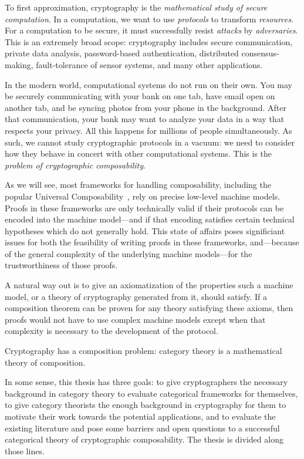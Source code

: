 

To first approximation, cryptography is the \emph{mathematical study of secure
computation}. In a computation, we want to use \emph{protocols} to transform
\emph{resources}. For a computation to be secure, it must successfully resist
\emph{attacks} by \emph{adversaries}. This is an extremely broad scope:
cryptography includes secure communication, private data analysis,
password-based authentication, distributed consensus-making, fault-tolerance of
sensor systems, and many other applications.

In the modern world, computational systems do not run on their own. You may be
securely communicating with your bank on one tab, have email open on another
tab, and be syncing photos from your phone in the background. After that
communication, your bank may want to analyze your data in a way that respects
your privacy. All this happens for millions of people simultaneously. As such,
we cannot study cryptographic protocols in a vacuum: we need to consider how
they behave in concert with other computational systems. This is the
\emph{problem of cryptographic composability}.

As we will see, most frameworks for handling composability, including the
popular Universal Composability~\cite{canetti-2000}, rely on precise low-level
machine models. Proofs in these frameworks are only technically valid if their
protocols can be encoded into the machine model---and if that encoding satisfies
certain technical hypotheses which do not generally hold. This state of affairs
poses significiant issues for both the feasibility of writing proofs in these
frameworks, and---because of the general complexity of the underlying
machine models---for the trustworthiness of those proofs.

A natural way out is to give an axiomatization of the properties such a machine
model, or a theory of cryptography generated from it, should satisfy. If a
composition theorem can be proven for any theory satisfying these axioms, then
proofs would not have to use complex machine models except when that complexity
is necessary to the development of the protocol.

Cryptography has a composition problem: category theory is a mathematical theory
of composition.

In some sense, this thesis has three goals: to give cryptographers the necessary
background in category theory to evaluate categorical frameworks for themselves,
to give category theorists the enough background in cryptography for them to
motivate their work towards the potential applications, and to evaluate the
existing literature and pose some barriers and open questions to a successful
categorical theory of cryptographic composability. The thesis is divided along
those lines.

